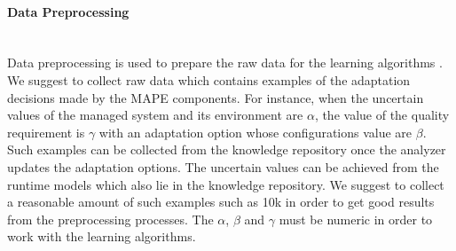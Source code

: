 \documentclass[a4paper,12pt]{article}
\newcommand{
    \subsubsubsection}[1]{\paragraph{#1}\mbox{}\\
}
\begin{document}
\subsubsubsection{Data Preprocessing}
Data preprocessing is used to prepare the raw data for the learning algorithms \cite{HOMLWSLATF-2017}. We suggest to collect raw data which contains examples of the adaptation decisions made by the MAPE components. For instance, when the uncertain values of the managed system and its environment are $\alpha$, the value of the quality requirement is $\gamma$ with an adaptation option whose configurations value are $\beta$. Such examples can be collected from the knowledge repository once the analyzer updates the adaptation options. The uncertain values can be achieved from the runtime models which also lie in the knowledge repository. We suggest to collect a reasonable amount of such examples such as 10k in order to get good results from the preprocessing processes. The $\alpha$, $\beta$ and $\gamma$ must be numeric in order to work with the learning algorithms.
\end{document}
